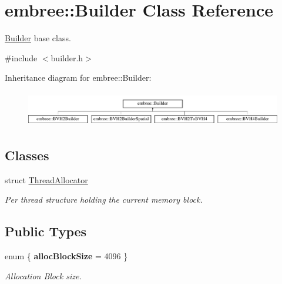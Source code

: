 \hypertarget{classembree_1_1_builder}{
\section{embree::Builder Class Reference}
\label{classembree_1_1_builder}
}


\hyperlink{classembree_1_1_builder}{Builder} base class.  




{\ttfamily \#include $<$builder.h$>$}

Inheritance diagram for embree::Builder:\begin{figure}[H]
\begin{center}
\leavevmode
\includegraphics[height=1.564246cm]{classembree_1_1_builder}
\end{center}
\end{figure}
\subsection*{Classes}
\begin{DoxyCompactItemize}
\item 
struct \hyperlink{structembree_1_1_builder_1_1_thread_allocator}{ThreadAllocator}
\begin{DoxyCompactList}\small\item\em Per thread structure holding the current memory block. \item\end{DoxyCompactList}\end{DoxyCompactItemize}
\subsection*{Public Types}
\begin{DoxyCompactItemize}
\item 
enum \{ {\bfseries allocBlockSize} =  4096
 \}
\begin{DoxyCompactList}\small\item\em Allocation Block size. \item\end{DoxyCompactList}\end{DoxyCompactItemize}
